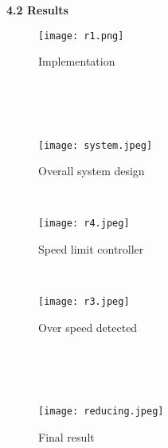 \documentclass[a4paper,12pt, English]{article}
\begin{document}
\begin{normalsize}
{\newpage
\begin{large}
\textbf{4.2 Results}
\end{large}
\newline
\begin{figure}[htb]
\begin{center}
\texttt{[image: r1.png]}
\end{center}
\begin{center}
\renewcommand{\thefigure}{4. 2. 1}
\caption{\footnotesize Implementation}
\end{center}
\end{figure}\\
\newpage
\\
\\
\begin{figure}[htb]
\begin{center}
\texttt{[image: system.jpeg]}
\end{center}
\begin{center}
\renewcommand{\thefigure}{4. 2. 2}
\caption{\footnotesize Overall system design}
\end{center}
\end{figure}\\
\newpage
\begin{figure}[htb]
\begin{center}
\texttt{[image: r4.jpeg]}
\end{center}
\begin{center}
\renewcommand{\thefigure}{4. 2. 3}
\caption{\footnotesize Speed limit controller}
\end{center}
\end{figure}\\
\newpage
\begin{figure}[htb]
\begin{center}
\texttt{[image: r3.jpeg]}
\end{center}
\begin{center}
\renewcommand{\thefigure}{4. 2. 4}
\caption{\footnotesize Over speed detected}
\end{center}
\end{figure}\\
\\
\\
\newpage
\begin{figure}[htb]
\begin{center}
\texttt{[image: reducing.jpeg]}
\end{center}
\begin{center}
\renewcommand{\thefigure}{4. 2. 5}
\caption{\footnotesize Final result}
\end{center}
\end{figure}\\
\newpage
\begin{center}

\end{center}}
\end{normalsize}
\end{document}
